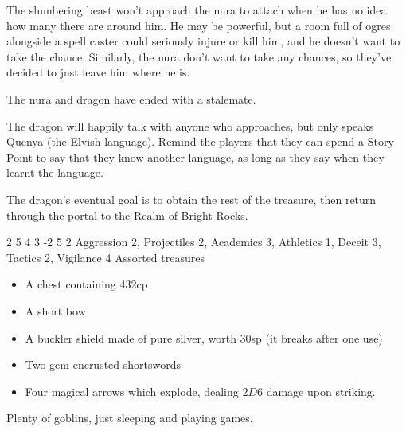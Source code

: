 \begin{multicols}{2}
\begin{exampletext}
	The slumbering beast won't approach the nura to attach when he has no idea how many there are around him.
	He may be powerful, but a room full of ogres alongside a spell caster could seriously injure or kill him, and he doesn't want to take the chance.
	Similarly, the nura don't want to take any chances, so they've decided to just leave him where he is.

	The nura and dragon have ended with a stalemate.

\end{exampletext}

The dragon will happily talk with anyone who approaches, but only speaks Quenya (the Elvish language).
Remind the players that they can spend a Story Point to say that they know another language, as long as they say when they learnt the language.

The dragon's eventual goal is to obtain the rest of the treasure, then return through the portal to the Realm of Bright Rocks.

{2}%
{5}%
{{4}%
{3}%
{-2}}%
{5}%
{2}%
{Aggression 2, Projectiles 2, Academics 3, Athletics 1, Deceit 3, Tactics 2, Vigilance 4}%
{Assorted treasures}%
{}



\begin{itemize}

	\item{A chest containing 432cp}
	\item{A short bow}
	\item{A buckler shield made of pure silver, worth 30sp (it breaks after one use)}
	\item{Two gem-encrusted shortswords}
	\item{Four magical arrows which explode, dealing $2D6$ damage upon striking.}

\end{itemize}




Plenty of goblins, just sleeping and playing games.

\goblin


\begin{exampletext}


\end{exampletext}
\end{multicols}
